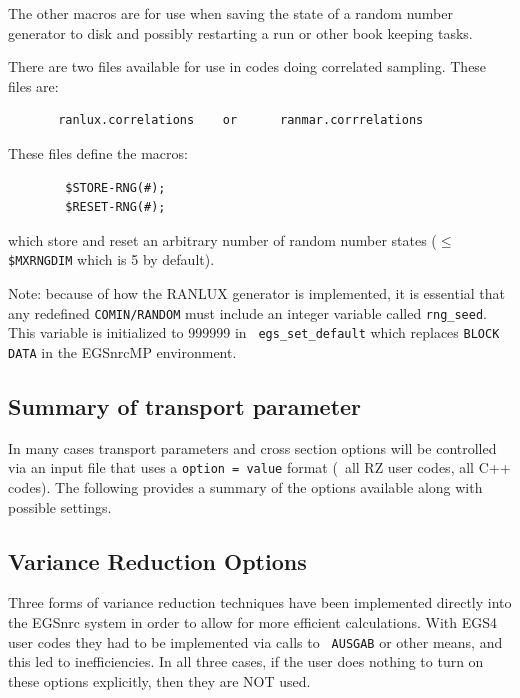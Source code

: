 The other macros are for use when saving the state of a random number
generator to disk and possibly restarting a run or other book keeping tasks.

There are two files available for use in codes doing correlated
sampling.  These files are:
\begin{verbatim}
       ranlux.correlations    or      ranmar.corrrelations
\end{verbatim}
These files define the macros:
\begin{verbatim}
        $STORE-RNG(#);
        $RESET-RNG(#);
\end{verbatim}
which store and reset an arbitrary number of random number states ($\le${\tt
\$MXRNGDIM} which is 5 by default).

Note: because of how the RANLUX generator is implemented, it is essential
that any redefined {\tt COMIN/RANDOM} must include an integer variable
called {\tt rng\_seed}. This variable is initialized to 999999 in {\tt
egs\_set\_default} which replaces {\tt BLOCK DATA} in the EGSnrcMP
environment\cite{Ka03}.
 

\subsection{Summary of transport parameter}
\label{param_options}


In many cases transport parameters and cross section options will be
controlled via an input file that uses a {\tt option = value} format
(\eg~all RZ user codes, all C++ codes). The following provides a summary
of the options available along with possible settings.


\subsection{Variance Reduction Options}
\label{VRO}
Three forms of variance reduction techniques have been implemented directly
into the EGSnrc system in order to allow for more efficient calculations.
With EGS4 user codes they had to be implemented via calls to {\tt
AUSGAB} or
other means, and this led to inefficiencies.  In all three cases, if the
user does nothing to turn on these options explicitly, then they are NOT
used.

